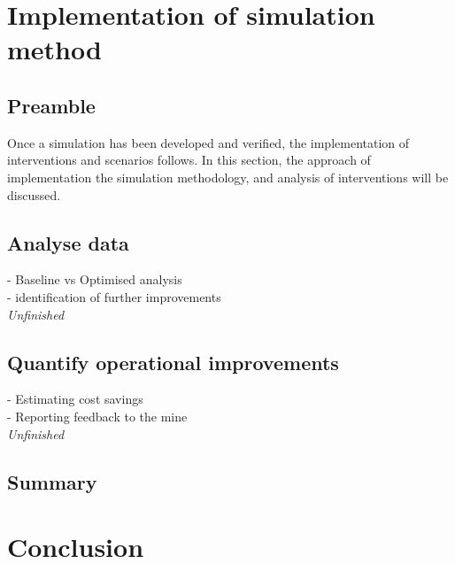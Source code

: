 \section{Implementation of simulation method}
	\subsection{Preamble}
		Once a simulation has been developed and verified, the implementation of interventions and scenarios follows. In this section, the approach of implementation the simulation methodology, and analysis of interventions will be discussed.
	\subsection{Analyse data}
		- Baseline vs Optimised analysis \\
		- identification of further improvements\\
		\textit{Unfinished}
	
	\subsection{Quantify operational improvements}
		- Estimating cost savings \\
		- Reporting feedback to the mine\\
		\textit{Unfinished}
	\subsection{Summary}
\section{Conclusion}
